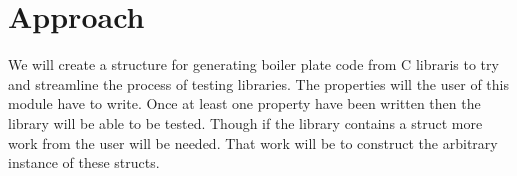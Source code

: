 \section{Approach}




We will create a structure for generating boiler plate code from C libraris to try and streamline the process of testing libraries.
The properties will the user of this module have to write.
Once at least one property have been written then the library will be able to be tested.
Though if the library contains a struct more work from the user will be needed.
That work will be to construct the arbitrary instance of these structs.

